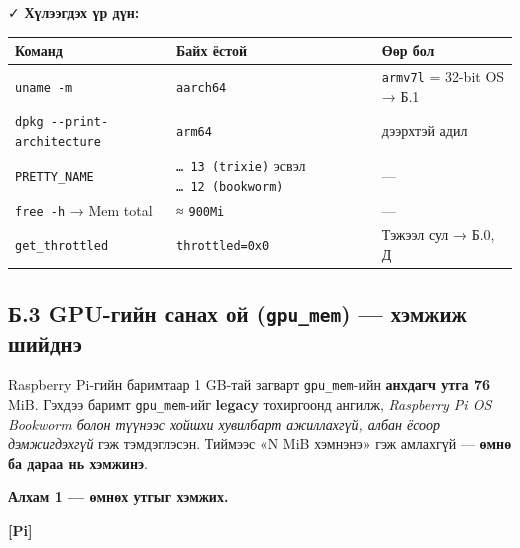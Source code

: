 \begin{Shaded}
\begin{Highlighting}[]
  \KeywordTok{\&\&}  
\end{Highlighting}
\end{Shaded}

✓ \textbf{Хүлээгдэх үр дүн:}

\begingroup\scriptsize\begin{longtable}[]{@{}lll@{}}
\toprule
Команд & Байх ёстой & Өөр бол\tabularnewline
\midrule
\endhead
\texttt{uname\ -m} & \texttt{aarch64} & \texttt{armv7l} = 32-bit OS → Б.1\tabularnewline
\texttt{dpkg\ -\/\allowbreak{}-print-architecture} & \texttt{arm64} & дээрхтэй адил\tabularnewline
\texttt{PRETTY\_NAME} & \texttt{\ldots{}\ 13\ (trixie)} эсвэл \texttt{\ldots{}\ 12\ (bookworm)} & ---\tabularnewline
\texttt{free\ -h} → Mem total & ≈ \texttt{900Mi} & ---\tabularnewline
\texttt{get\_throttled} & \texttt{throttled=0x0} & Тэжээл сул → Б.0, Д\tabularnewline
\bottomrule
\end{longtable}\endgroup

\hypertarget{ux431.3-gpu-ux433ux438ux439ux43d-ux441ux430ux43dux430ux445-ux43eux439-gpu_mem-ux445ux44dux43cux436ux438ux436-ux448ux438ux439ux434ux43dux44d}{%
\subsection{\texorpdfstring{Б.3 GPU-гийн санах ой (\texttt{gpu\_mem}) --- хэмжиж шийднэ}{Б.3 GPU-гийн санах ой (gpu\_mem) --- хэмжиж шийднэ}}\label{ux431.3-gpu-ux433ux438ux439ux43d-ux441ux430ux43dux430ux445-ux43eux439-gpu_mem-ux445ux44dux43cux436ux438ux436-ux448ux438ux439ux434ux43dux44d}}

Raspberry Pi-гийн баримтаар 1 GB-тай загварт \texttt{gpu\_mem}-ийн \textbf{анхдагч утга 76} MiB. Гэхдээ баримт \texttt{gpu\_mem}-ийг \textbf{legacy} тохиргоонд ангилж, \emph{Raspberry Pi OS Bookworm болон түүнээс хойшхи хувилбарт ажиллахгүй, албан ёсоор дэмжигдэхгүй} гэж тэмдэглэсэн. Тиймээс «N MiB хэмнэнэ» гэж амлахгүй --- \textbf{өмнө ба дараа нь хэмжинэ}.

\textbf{Алхам 1 --- өмнөх утгыг хэмжих.}

\textbf{{[}Pi{]}}

\begin{Shaded}
\begin{Highlighting}[]
\end{Highlighting}
\end{Shaded}

